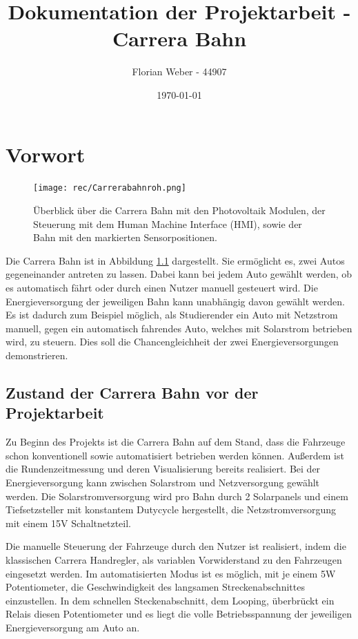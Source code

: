 \documentclass[a4paper, 11pt]{report}
\title{Dokumentation der Projektarbeit - Carrera Bahn}
\author{Florian Weber - 44907}
\date{\today}
\begin{document}
\maketitle	%

\begin{spacing}{0.9}
\tableofcontents 	%

\listoffigures		%
\listoftables
\end{spacing}
\newpage

\chapter{Vorwort}%
	\begin{figure}[b]
	\centering
	\texttt{[image: rec/Carrerabahnroh.png]}
	\caption[Überblick über die Carrera Bahn]{Überblick über die Carrera Bahn mit den Photovoltaik Modulen, der Steuerung mit dem Human Machine Interface (HMI), sowie der Bahn mit den markierten Sensorpositionen.}
	\label{img:carrerakomplett}
	\end{figure}
Die Carrera Bahn ist in Abbildung \ref{img:carrerakomplett} dargestellt. Sie ermöglicht es, zwei Autos gegeneinander antreten zu lassen. Dabei kann bei jedem Auto gewählt werden, ob es automatisch fährt oder durch einen Nutzer manuell gesteuert wird. Die Energieversorgung der jeweiligen Bahn kann unabhängig davon gewählt werden. Es ist dadurch zum Beispiel möglich, als Studierender ein Auto mit Netzstrom manuell, gegen ein automatisch fahrendes Auto, welches mit Solarstrom betrieben wird, zu steuern.
 Dies soll die Chancengleichheit der zwei Energieversorgungen demonstrieren. %

\section{Zustand der Carrera Bahn vor der Projektarbeit}\label{sec:before}
Zu Beginn des Projekts ist die Carrera Bahn auf dem Stand, dass die Fahrzeuge schon konventionell sowie automatisiert betrieben werden können. Außerdem ist die Rundenzeitmessung und deren Visualisierung bereits realisiert. Bei der Energieversorgung kann zwischen Solarstrom und Netzversorgung gewählt werden.
Die Solarstromversorgung wird pro Bahn durch 2 Solarpanels und einem Tiefsetzsteller mit konstantem Dutycycle hergestellt, die Netzstromversorgung mit einem 15V Schaltnetzteil.

Die manuelle Steuerung der Fahrzeuge durch den Nutzer ist realisiert, indem die klassischen Carrera Handregler, als variablen Vorwiderstand zu den Fahrzeugen eingesetzt werden. 
Im automatisierten Modus ist es möglich, mit je einem 5W Potentiometer, die Geschwindigkeit des langsamen Streckenabschnittes einzustellen. In dem schnellen Steckenabschnitt, dem Looping, überbrückt ein Relais diesen Potentiometer und es liegt die volle Betriebsspannung der jeweiligen Energieversorgung am Auto an.
\newpage
\end{document}
